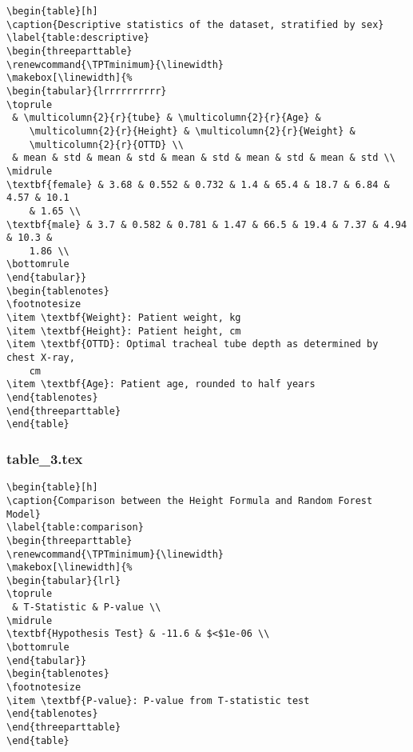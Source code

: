 \documentclass[11pt]{article}
\begin{document}
\begin{Verbatim}[tabsize=4]
\begin{table}[h]
\caption{Descriptive statistics of the dataset, stratified by sex}
\label{table:descriptive}
\begin{threeparttable}
\renewcommand{\TPTminimum}{\linewidth}
\makebox[\linewidth]{%
\begin{tabular}{lrrrrrrrrrr}
\toprule
 & \multicolumn{2}{r}{tube} & \multicolumn{2}{r}{Age} &
	\multicolumn{2}{r}{Height} & \multicolumn{2}{r}{Weight} &
	\multicolumn{2}{r}{OTTD} \\
 & mean & std & mean & std & mean & std & mean & std & mean & std \\
\midrule
\textbf{female} & 3.68 & 0.552 & 0.732 & 1.4 & 65.4 & 18.7 & 6.84 & 4.57 & 10.1
	& 1.65 \\
\textbf{male} & 3.7 & 0.582 & 0.781 & 1.47 & 66.5 & 19.4 & 7.37 & 4.94 & 10.3 &
	1.86 \\
\bottomrule
\end{tabular}}
\begin{tablenotes}
\footnotesize
\item \textbf{Weight}: Patient weight, kg
\item \textbf{Height}: Patient height, cm
\item \textbf{OTTD}: Optimal tracheal tube depth as determined by chest X-ray,
	cm
\item \textbf{Age}: Patient age, rounded to half years
\end{tablenotes}
\end{threeparttable}
\end{table}

\end{Verbatim}

\subsubsection*{table\_3.tex}

\begin{Verbatim}[tabsize=4]
\begin{table}[h]
\caption{Comparison between the Height Formula and Random Forest Model}
\label{table:comparison}
\begin{threeparttable}
\renewcommand{\TPTminimum}{\linewidth}
\makebox[\linewidth]{%
\begin{tabular}{lrl}
\toprule
 & T-Statistic & P-value \\
\midrule
\textbf{Hypothesis Test} & -11.6 & $<$1e-06 \\
\bottomrule
\end{tabular}}
\begin{tablenotes}
\footnotesize
\item \textbf{P-value}: P-value from T-statistic test
\end{tablenotes}
\end{threeparttable}
\end{table}

\end{Verbatim}
\end{document}
